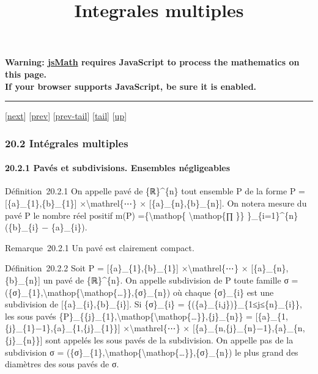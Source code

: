 \documentclass[]{article}
\title{Integrales multiples}
\author{}
\date{}
\begin{document}
\maketitle

\textbf{Warning: \href{http://www.math.union.edu/locate/jsMath}{jsMath}
requires JavaScript to process the mathematics on this page.\\ If your
browser supports JavaScript, be sure it is enabled.}

\begin{center}\rule{3in}{0.4pt}\end{center}

{[}\href{coursse106.html}{next}{]} {[}\href{coursse104.html}{prev}{]}
{[}\href{coursse104.html\#tailcoursse104.html}{prev-tail}{]}
{[}\hyperref[tailcoursse105.html]{tail}{]}
{[}\href{coursch21.html\#coursse105.html}{up}{]}

\subsubsection{20.2 Intégrales multiples}

\paragraph{20.2.1 Pavés et subdivisions. Ensembles négligeables}

Définition~20.2.1 On appelle pavé de \{ℝ\}\^{}\{n\} tout ensemble P de
la forme P = {[}\{a\}\_\{1\},\{b\}\_\{1\}{]}
×\textbackslash{}mathrel\{⋯\} × {[}\{a\}\_\{n\},\{b\}\_\{n\}{]}. On
notera mesure du pavé P le nombre réel positif m(P)
=\{\textbackslash{}mathop\{ \textbackslash{}mathop\{∏ \}\}
\}\_\{i=1\}\^{}\{n\}(\{b\}\_\{i\} − \{a\}\_\{i\}).

Remarque~20.2.1 Un pavé est clairement compact.

Définition~20.2.2 Soit P = {[}\{a\}\_\{1\},\{b\}\_\{1\}{]}
×\textbackslash{}mathrel\{⋯\} × {[}\{a\}\_\{n\},\{b\}\_\{n\}{]} un pavé
de \{ℝ\}\^{}\{n\}. On appelle subdivision de P toute famille σ =
(\{σ\}\_\{1\},\textbackslash{}mathop\{\textbackslash{}mathop\{\ldots{}\}\},\{σ\}\_\{n\})
où chaque \{σ\}\_\{i\} est une subdivision de
{[}\{a\}\_\{i\},\{b\}\_\{i\}{]}. Si \{σ\}\_\{i\} =
\{(\{a\}\_\{i,j\})\}\_\{1≤j≤\{n\}\_\{i\}\}, les sous pavés
\{P\}\_\{\{j\}\_\{1\},\textbackslash{}mathop\{\textbackslash{}mathop\{\ldots{}\}\},\{j\}\_\{n\}\}
= {[}\{a\}\_\{1,\{j\}\_\{1\}−1\},\{a\}\_\{1,\{j\}\_\{1\}\}{]}
×\textbackslash{}mathrel\{⋯\} ×
{[}\{a\}\_\{n,\{j\}\_\{n\}−1\},\{a\}\_\{n,\{j\}\_\{n\}\}{]} sont appelés
les sous pavés de la subdivision. On appelle pas de la subdivision σ =
(\{σ\}\_\{1\},\textbackslash{}mathop\{\textbackslash{}mathop\{\ldots{}\}\},\{σ\}\_\{n\})
le plus grand des diamètres des sous pavés de σ.
\end{document}
